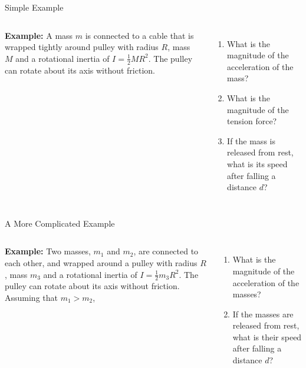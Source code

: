 \documentclass[12pt,compress,aspectratio=169]{beamer}
\begin{document}
\begin{frame}[t]{Simple Example}
  \begin{columns}
    \centering

    \textbf{Example:} A mass $m$ is connected to a cable that is wrapped
    tightly around pulley with radius $R$, mass $M$ and a rotational inertia of
    $I=\frac12MR^2$. The pulley can rotate about its axis without friction.
    \begin{enumerate}
    \item What is the magnitude of the acceleration of the mass?
    \item What is the magnitude of the tension force?
    \item If the mass is released from rest, what is its speed after falling
      a distance $d$?
    \end{enumerate}
  \end{columns}
  
\end{frame}



\begin{frame}[t]{A More Complicated Example}
  \begin{columns}[T]
    \centering
    

    \textbf{Example:} Two masses, $m_1$ and $m_2$, are connected to each other,
    and wrapped around a pulley with radius $R$, mass $m_3$ and a rotational
    inertia of $I=\frac12m_3R^2$. The pulley can rotate about its axis without
    friction. Assuming that $m_1>m_2$,
    \begin{enumerate}
    \item What is the magnitude of the acceleration of the  masses?
    \item If the masses are released from rest, what is their speed after
      falling a distance $d$?
    \end{enumerate}
  \end{columns}
\end{frame}
\end{document}
